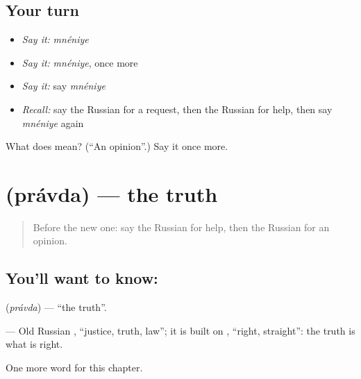\subsection*{Your turn}
\begin{itemize}
\raggedright
  \item \emph{Say it:} \emph{mnéniye}
  \item \emph{Say it:} \emph{mnéniye}, once more
  \item \emph{Say it:} say \emph{mnéniye}
  \item \emph{Recall:} say the Russian for a request, then the Russian for help, then say \emph{mnéniye} again
\end{itemize}

\begin{tcolorbox}[breakable,colback=teal!4,colframe=teal!35!black,title={Before you move on}]
What does  mean? (\textquotedblleft{}An opinion\textquotedblright{}.) Say it once more.
\end{tcolorbox}
\section[\texorpdfstring{\ru{правда} (právda)}{правда (právda)}]{ (právda) — the truth}

\label{lesson:RU-C169-pravda}



\begin{quote}
Before the new one: say the Russian for help, then the Russian for an opinion.
\end{quote}

\subsection*{You'll want to know: }
\textbf{} (\emph{právda}) — \textquotedblleft{}the truth\textquotedblright{}.

\begin{cousinweb}
\textbf{} — Old Russian \emph{}, \textquotedblleft{}justice, truth, law\textquotedblright{}; it is built on \emph{}, \textquotedblleft{}right, straight\textquotedblright{}: the truth is what is right.
\end{cousinweb}

\begin{grammarlens}[title={What you've built}]
One more word for this chapter.
\end{grammarlens}

